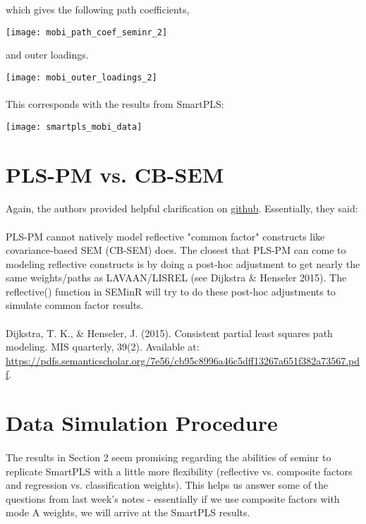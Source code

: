 \documentclass{article}
\begin{document}
which gives the following path coefficients,

\texttt{[image: mobi\_path\_coef\_seminr\_2]}

and outer loadings.

\texttt{[image: mobi\_outer\_loadings\_2]}

\paragraph{}
This corresponds with the results from SmartPLS:

\texttt{[image: smartpls\_mobi\_data]}

\section{PLS-PM vs. CB-SEM}

\paragraph{}
Again, the authors provided helpful clarification on \href{https://github.com/sem-in-r/seminr/issues/132}{github}. Essentially, they said:

\paragraph{}
PLS-PM cannot natively model reflective "common factor" constructs like covariance-based SEM (CB-SEM) does. The closest that PLS-PM can come to modeling reflective constructs is by doing a post-hoc adjustment to get nearly the same weights/paths as LAVAAN/LISREL (see Dijkstra \& Henseler 2015). The reflective() function in SEMinR will try to do these post-hoc adjustments to simulate common factor results.

\paragraph{}
Dijkstra, T. K., \& Henseler, J. (2015). Consistent partial least squares path modeling. MIS quarterly, 39(2). Available at: \url{https://pdfs.semanticscholar.org/7e56/cb95c8996a46c5dff13267a651f382a73567.pdf}.

\section{Data Simulation Procedure}

\paragraph{} 
The results in Section 2 seem promising regarding the abilities of seminr to replicate SmartPLS with a little more flexibility (reflective vs. composite factors and regression vs. classification weights). This helps us answer some of the questions from last week's notes - essentially if we use composite factors with mode A weights, we will arrive at the SmartPLS results.
\end{document}
